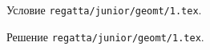 \problem
Условие \texttt{regatta/junior/geomt/1.tex}.

\solution Решение \texttt{regatta/junior/geomt/1.tex}.
\endproblem
